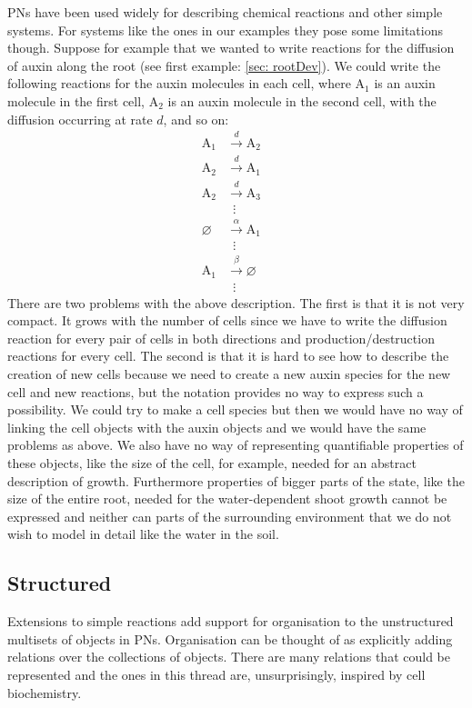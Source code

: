 PNs have been used widely for describing chemical reactions and other simple
systems. For systems like the ones in our examples they pose some limitations
though. Suppose for example that we wanted to write reactions for the diffusion
of auxin along the root (see first example: \ref{sec: rootDev}). We could write
the following reactions for the auxin molecules in each cell, where
$\mathrm{A}_1$ is an auxin molecule in the first cell, $\mathrm{A}_2$ is an
auxin molecule in the second cell, with the diffusion occurring at rate
$d$, and so on:
\begin{align*}
\mathrm{A}_1 &\xrightarrow{d} \mathrm{A}_2 \\
\mathrm{A}_2 &\xrightarrow{d} \mathrm{A}_1 \\
\mathrm{A}_2 &\xrightarrow{d} \mathrm{A}_3\\
 &  \hspace{6pt}  \vdots& \\
\varnothing & \xrightarrow{\alpha} \mathrm{A}_1 \\
 & \hspace{6pt}  \vdots &\\
\mathrm{A}_1 &\xrightarrow{\beta} \varnothing \\
  & \hspace{6pt}  \vdots 
\end{align*}
There are two problems with the above description. The first is that it is not
very compact. It grows with the number of cells since we have to write the
diffusion reaction for every pair of cells in both directions and
production/destruction reactions for every cell. The second is that it is hard
to see how to describe the creation of new cells because we need to create a new
auxin species for the new cell and new reactions, but the notation provides no
way to express such a possibility. We could try to make a cell species but then
we would have no way of linking the cell objects with the auxin objects and we
would have the same problems as above. We also have no way of representing
quantifiable properties of these objects, like the size of the cell, for
example, needed for an abstract description of growth. Furthermore properties of
bigger parts of the state, like the size of the entire root, needed for the
water-dependent shoot growth cannot be expressed and neither can parts of the
surrounding environment that we do not wish to model in detail like the water in
the soil.

\subsection{Structured}
\label{subsec:structLangs}
Extensions to simple reactions add support for organisation to the
unstructured multisets of objects in PNs. Organisation can be thought of as
explicitly adding relations over the collections of objects. There are many
relations that could be represented and the ones in this thread are,
unsurprisingly, inspired by cell biochemistry.

